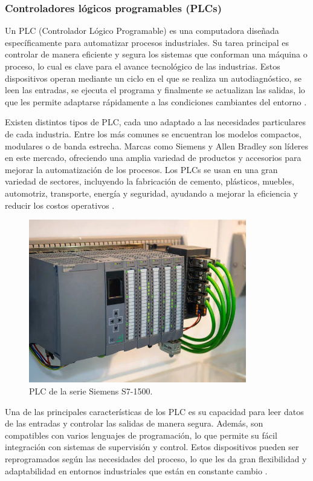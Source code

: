 \subsubsection{Controladores lógicos programables (PLCs)}

Un PLC (Controlador Lógico Programable) es una computadora diseñada específicamente para automatizar procesos industriales. Su tarea principal es controlar de manera eficiente y segura los sistemas que conforman una máquina o proceso, lo cual es clave para el avance tecnológico de las industrias. Estos dispositivos operan mediante un ciclo en el que se realiza un autodiagnóstico, se leen las entradas, se ejecuta el programa y finalmente se actualizan las salidas, lo que les permite adaptarse rápidamente a las condiciones cambiantes del entorno  \cite{plc_info}.

Existen distintos tipos de PLC, cada uno adaptado a las necesidades particulares de cada industria. Entre los más comunes se encuentran los modelos compactos, modulares o de banda estrecha. Marcas como Siemens y Allen Bradley son líderes en este mercado, ofreciendo una amplia variedad de productos y accesorios para mejorar la automatización de los procesos. Los PLCs se usan en una gran variedad de sectores, incluyendo la fabricación de cemento, plásticos, muebles, automotriz, transporte, energía y seguridad, ayudando a mejorar la eficiencia y reducir los costos operativos  \cite{plc_info}.

\begin{figure} [h!]
  \begin{center}
    \includegraphics[width=9.5cm]{figs/info_plc}
  \end{center}
  \caption{\centering PLC de la serie Siemens S7-1500.}
  \label{fig:info_plc}
\end{figure} 

Una de las principales características de los PLC es su capacidad para leer datos de las entradas y controlar las salidas de manera segura. Además, son compatibles con varios lenguajes de programación, lo que permite su fácil integración con sistemas de supervisión y control. Estos dispositivos pueden ser reprogramados según las necesidades del proceso, lo que les da gran flexibilidad y adaptabilidad en entornos industriales que están en constante cambio  \cite{plc_info}. \\

